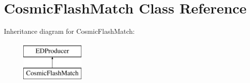 \hypertarget{classCosmicFlashMatch}{\section{Cosmic\-Flash\-Match Class Reference}
\label{classCosmicFlashMatch}
}
Inheritance diagram for Cosmic\-Flash\-Match\-:\begin{figure}[H]
\begin{center}
\leavevmode
\includegraphics[height=2.000000cm]{classCosmicFlashMatch}
\end{center}
\end{figure}

